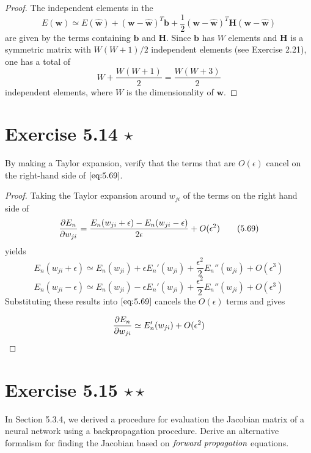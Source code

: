 \begin{proof}
    The independent elements in the
    \begin{equation*}
        E(\mathbf{w}) \simeq E(\mathbf{\widehat{w}}) + 
        (\mathbf{w} - \widehat{\mathbf{w}})^T\mathbf{b}
        + \frac{1}{2}(\mathbf{w} - \mathbf{\widehat{w}})^T \mathbf{H} (\mathbf{w} - \mathbf{\widehat{w}})
        \tag{5.28}\label{eq:5.28}
    \end{equation*}
    are given by the terms containing $\mathbf{b}$ and $\mathbf{H}$.
    Since $\mathbf{b}$ has $W$ elements and $\mathbf{H}$ is a symmetric matrix
    with $W(W + 1) / 2$ independent elements (see Exercise 2.21), one has a total of
    $$W + \frac{W(W + 1)}{2} = \frac{W(W + 3)}{2}$$ independent elements,
    where $W$ is the dimensionality of $\mathbf{w}$.
\end{proof}

\section*{Exercise 5.14 $\star$}
By making a Taylor expansion, verify that the terms that are $O(\epsilon)$ 
cancel on the right-hand side of $\eqref{eq:5.69}$.

\vspace{1em}

\begin{proof}
    Taking the Taylor expansion around $w_{ji}$ of the terms on the right hand side of
    \begin{equation*}
        \pdv{E_n}{w_{ji}} = \frac{E_n(w_{ji} + \epsilon) - E_n(w_{ji} - \epsilon)}{2\epsilon}
        + O(\epsilon^2)
        \tag{5.69}\label{eq:5.69}
    \end{equation*}
    yields
    \[
        E_n(w_{ji} + \epsilon) \simeq E_n(w_{ji}) + \epsilon E_n'(w_{ji}) 
        + \frac{\epsilon^2}{2} E_n''(w_{ji}) + O(\epsilon^3)
    \] 
    \[
        E_n(w_{ji} - \epsilon) \simeq E_n(w_{ji}) - \epsilon E_n'(w_{ji}) 
        + \frac{\epsilon^2}{2} E_n''(w_{ji}) + O(\epsilon^3)
    \] 
    Substituting these results into $\eqref{eq:5.69}$ cancels
    the $O(\epsilon)$ terms and gives

    \[
        \pdv{E_n}{w_{ji}} \simeq E_n'(w_{ji}) + O(\epsilon^2)
    \] 
\end{proof}

\section*{Exercise 5.15 $\star \star$}
In Section 5.3.4, we derived a procedure for evaluation the Jacobian
matrix of a neural network using a backpropagation procedure.
Derive an alternative formalism for finding the Jacobian based on 
$\emph{forward propagation}$ equations.

